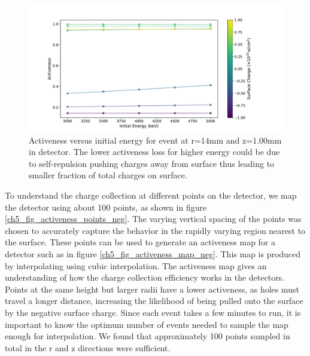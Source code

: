 \begin{figure}%
\centering
\includegraphics[trim={2cm 0cm 3cm 0cm},clip,width=0.99\linewidth]{ch5/figs/activness_vs_eng.pdf}
\caption{Activeness versus initial energy for event at r=$14$mm and z=$1.00$mm in {\ponama} detector. The lower activeness loss for higher energy could be due to self-repulsion pushing charges away from surface thus leading to smaller fraction of total charges on surface.}
\label{ch5_fig_act_eng}
\end{figure}

To understand the charge collection at different points on the detector, we map the detector using about 100 points, as shown in figure \ref{ch5_fig_activeness_points_neg}. The varying vertical spacing of the points was chosen to accurately capture the behavior in the rapidly varying region nearest to the surface. These points can be used to generate an activeness map for a detector such as in figure \ref{ch5_fig_activeness_map_neg}. This map is produced by interpolating using cubic interpolation. The activeness map gives an understanding of how the charge collection efficiency works in the detectors. Points at the same height but larger radii have a lower activeness, as holes must travel a longer distance, increasing the likelihood of being pulled onto the surface by the negative surface charge. Since each event takes a few minutes to run, it is important to know the optimum number of events needed to sample the map enough for interpolation. We found that approximately 100 points sampled in total in the r and z directions were sufficient.

